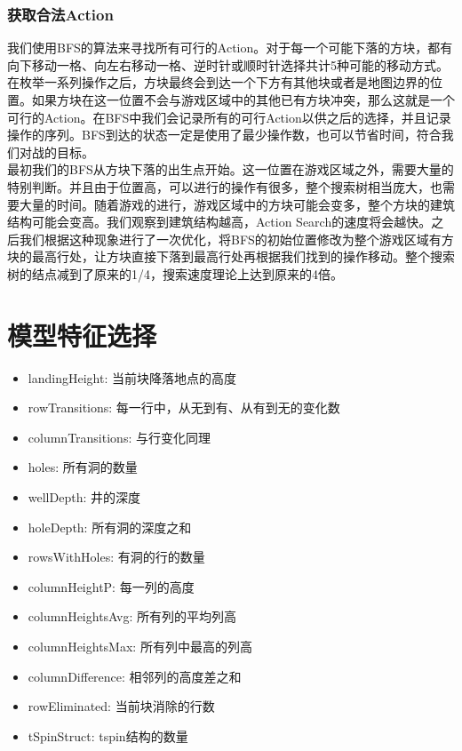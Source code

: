\documentclass[10pt,UTF8]{article}
\begin{document}
\begin{multicols}{2}
\subsubsection{获取合法Action}

我们使用BFS的算法来寻找所有可行的Action。对于每一个可能下落的方块，都有向下移动一格、向左右移动一格、逆时针或顺时针选择共计5种可能的移动方式。在枚举一系列操作之后，方块最终会到达一个下方有其他块或者是地图边界的位置。如果方块在这一位置不会与游戏区域中的其他已有方块冲突，那么这就是一个可行的Action。在BFS中我们会记录所有的可行Action以供之后的选择，并且记录操作的序列。BFS到达的状态一定是使用了最少操作数，也可以节省时间，符合我们对战的目标。\\

最初我们的BFS从方块下落的出生点开始。这一位置在游戏区域之外，需要大量的特别判断。并且由于位置高，可以进行的操作有很多，整个搜索树相当庞大，也需要大量的时间。随着游戏的进行，游戏区域中的方块可能会变多，整个方块的建筑结构可能会变高。我们观察到建筑结构越高，Action Search的速度将会越快。之后我们根据这种现象进行了一次优化，将BFS的初始位置修改为整个游戏区域有方块的最高行处，让方块直接下落到最高行处再根据我们找到的操作移动。整个搜索树的结点减到了原来的1/4，搜索速度理论上达到原来的4倍。

\section{模型特征选择}

\begin{itemize}
    \itemsep-5pt
    \item landingHeight: 当前块降落地点的高度
    \item rowTransitions: 每一行中，从无到有、从有到无的变化数
    \item columnTransitions: 与行变化同理
    \item holes: 所有洞的数量
    \item wellDepth: 井的深度
    \item holeDepth: 所有洞的深度之和
    \item rowsWithHoles: 有洞的行的数量
    \item columnHeightP: 每一列的高度
    \item columnHeightsAvg: 所有列的平均列高
    \item columnHeightsMax: 所有列中最高的列高
    \item columnDifference: 相邻列的高度差之和
    \item rowEliminated: 当前块消除的行数
    \item tSpinStruct: tspin结构的数量
\end{itemize}


\end{multicols}
\end{document}
